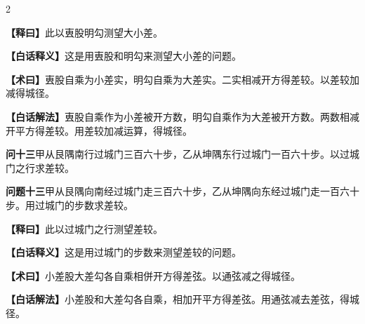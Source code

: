 \documentclass[11pt,a4paper]{article}
\newcommand{\WenQuestion}[1]{\textbf{\textcolor{classicalcolor}{#1}}}
\newcommand{\BaiQuestion}[1]{\textbf{\textcolor{moderncolor}{#1}}}
\newcommand{\WenExplain}{\textcolor{classicalcolor}{\textbf{【释曰】}}}
\newcommand{\BaiExplain}{\textcolor{moderncolor}{\textbf{【白话释义】}}}
\newcommand{\WenMethod}{\textcolor{classicalcolor}{\textbf{【术曰】}}}
\newcommand{\BaiMethod}{\textcolor{moderncolor}{\textbf{【白话解法】}}}
\begin{document}
\begin{paracol}{2}
\switchcolumn*
\begin{tcolorbox}[colback=red!5,colframe=red!30!black,boxrule=0.3pt]
\WenExplain\quad 此以叀股明勾测望大小差。
\end{tcolorbox}
\switchcolumn
\begin{tcolorbox}[colback=blue!5,colframe=blue!30!black,boxrule=0.3pt]
\BaiExplain\quad 这是用叀股和明勾来测望大小差的问题。
\end{tcolorbox}

\switchcolumn*
\begin{tcolorbox}[colback=red!5,colframe=red!40!black,boxrule=0.3pt]
\WenMethod\quad 叀股自乘为小差实，明勾自乘为大差实。二实相减开方得差较。以差较加减得城径。
\end{tcolorbox}
\switchcolumn
\begin{tcolorbox}[colback=blue!5,colframe=blue!40!black,boxrule=0.3pt]
\BaiMethod\quad 叀股自乘作为小差被开方数，明勾自乘作为大差被开方数。两数相减开平方得差较。用差较加减运算，得城径。
\end{tcolorbox}

\vspace{0.8em}

\switchcolumn*
\begin{tcolorbox}[colback=red!3,colframe=red!30!black,boxrule=0.3pt]
\WenQuestion{问十三}\quad 甲从艮隅南行过城门三百六十步，乙从坤隅东行过城门一百六十步。以过城门之行求差较。
\end{tcolorbox}
\switchcolumn
\begin{tcolorbox}[colback=blue!3,colframe=blue!30!black,boxrule=0.3pt]
\BaiQuestion{问题十三}\quad 甲从艮隅向南经过城门走三百六十步，乙从坤隅向东经过城门走一百六十步。用过城门的步数求差较。
\end{tcolorbox}

\switchcolumn*
\begin{tcolorbox}[colback=red!5,colframe=red!30!black,boxrule=0.3pt]
\WenExplain\quad 此以过城门之行测望差较。
\end{tcolorbox}
\switchcolumn
\begin{tcolorbox}[colback=blue!5,colframe=blue!30!black,boxrule=0.3pt]
\BaiExplain\quad 这是用过城门的步数来测望差较的问题。
\end{tcolorbox}

\switchcolumn*
\begin{tcolorbox}[colback=red!5,colframe=red!40!black,boxrule=0.3pt]
\WenMethod\quad 小差股大差勾各自乘相併开方得差弦。以通弦减之得城径。
\end{tcolorbox}
\switchcolumn
\begin{tcolorbox}[colback=blue!5,colframe=blue!40!black,boxrule=0.3pt]
\BaiMethod\quad 小差股和大差勾各自乘，相加开平方得差弦。用通弦减去差弦，得城径。
\end{tcolorbox}


\end{paracol}
\end{document}

